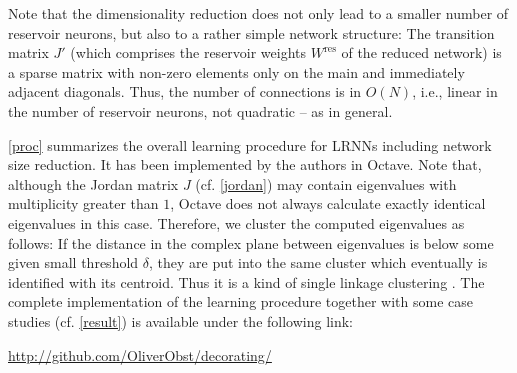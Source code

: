 \documentclass[twoside,11pt]{article}
\theoremstyle{definition}
\begin{document}
Note that the dimensionality reduction does not only lead to a smaller number of
reservoir neurons, but also to a rather simple network structure: The transition
matrix $J'$ (which comprises the reservoir weights $W^\mathrm{res}$ of
the reduced network) is a sparse matrix with non-zero elements only on the main
and immediately adjacent diagonals. Thus, the number of connections is in
$O(N)$, i.e., linear in the number of reservoir neurons, not quadratic -- as in
general.

\cref{proc} summarizes the overall learning procedure for LRNNs including
network size reduction. It has been implemented by the authors in Octave. Note
that, although the Jordan matrix $J$ (cf. \cref{jordan}) may
contain eigenvalues with multiplicity greater than $1$, Octave does not always
calculate exactly identical eigenvalues in this case. Therefore, we cluster the
computed eigenvalues as follows: If the distance in the complex plane between
eigenvalues is below some given small threshold $\delta$, they are put into the
same cluster which eventually is identified with its centroid. Thus it is a kind
of single linkage clustering \citep{GR69}. The complete implementation of the
learning procedure together with some case studies (cf. \cref{result}) is
available under the following link:
\begin{center}
	\url{http://github.com/OliverObst/decorating/}
\end{center}
\end{document}
